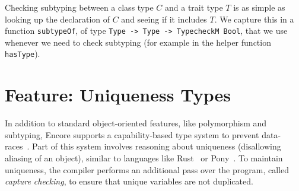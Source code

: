 \documentclass[sigplan,screen]{acmart}
\makeatletter
\newcommand{\ec}[1]{\lstinline[style=encore,breaklines=true,basicstyle=\fontsize{9}{9}\tt]@#1@}
\makeatother
\begin{document}
Checking subtyping between a class type $C$ and a trait type $T$
is as simple as looking up the declaration of $C$ and seeing if it
includes $T$. We capture this in a function \ec{subtypeOf}, of type
\ec{Type -> Type -> TypecheckM Bool}, that we use whenever we need
to check subtyping (for example in the helper function \ec{hasType}).


%
%


\section{Feature: Uniqueness Types}
\label{sec: capabilities}

In addition to standard object-oriented features, like
polymorphism and subtyping, Encore supports a capability-based
type system to prevent data-races~\cite{Kappa}. Part of this
system involves reasoning about uniqueness (disallowing aliasing
of an object), similar to languages like Rust~\cite{Rust} or
Pony~\cite{DBLP:conf/agere/ClebschDBM15}. To maintain uniqueness,
the compiler performs an additional pass over the program, called
\emph{capture checking}, to ensure that unique variables are not
duplicated.
\end{document}
